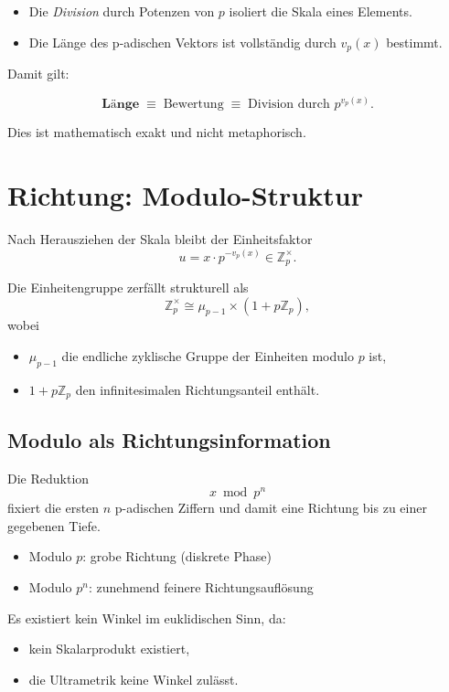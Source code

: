 \documentclass[12pt]{article}
\begin{document}
\begin{itemize}
  \item Die \emph{Division} durch Potenzen von \(p\) isoliert die Skala eines Elements.
  \item Die Länge des p-adischen Vektors ist vollständig durch \(v_p(x)\) bestimmt.
\end{itemize}

Damit gilt:

\[
\textbf{Länge} \;\equiv\; \text{Bewertung} \;\equiv\; \text{Division durch } p^{v_p(x)}.
\]

Dies ist mathematisch exakt und nicht metaphorisch.

\section{Richtung: Modulo-Struktur}

Nach Herausziehen der Skala bleibt der Einheitsfaktor
\[
u = x \cdot p^{-v_p(x)} \in \mathbb{Z}_p^\times.
\]

Die Einheitengruppe zerfällt strukturell als
\[
\mathbb{Z}_p^\times \cong \mu_{p-1} \times (1 + p\mathbb{Z}_p),
\]
wobei
\begin{itemize}
  \item \(\mu_{p-1}\) die endliche zyklische Gruppe der Einheiten modulo \(p\) ist,
  \item \(1 + p\mathbb{Z}_p\) den infinitesimalen Richtungsanteil enthält.
\end{itemize}

\subsection*{Modulo als Richtungsinformation}

Die Reduktion
\[
x \bmod p^n
\]
fixiert die ersten \(n\) p-adischen Ziffern und damit eine Richtung bis zu einer gegebenen Tiefe.

\begin{itemize}
  \item Modulo \(p\): grobe Richtung (diskrete Phase)
  \item Modulo \(p^n\): zunehmend feinere Richtungsauflösung
\end{itemize}

Es existiert kein Winkel im euklidischen Sinn, da:
\begin{itemize}
  \item kein Skalarprodukt existiert,
  \item die Ultrametrik keine Winkel zulässt.
\end{itemize}
\end{document}
